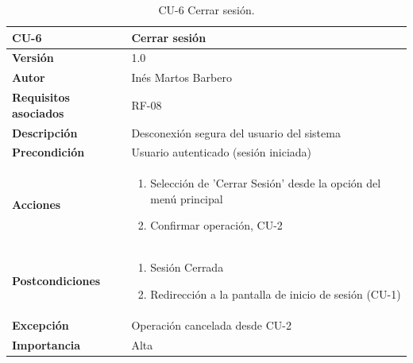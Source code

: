 \begin{table}[p]
	\centering
	\begin{tabularx}{\linewidth}{ p{} p{} }
		\toprule
		\textbf{CU-6}    & \textbf{Cerrar sesión}\\
		\toprule
		\textbf{Versión}              & 1.0    \\
		\textbf{Autor}                & Inés Martos Barbero \\
		\textbf{Requisitos asociados} & RF-08 \\
		\textbf{Descripción}          & Desconexión segura del usuario del sistema \\
		\textbf{Precondición}         & Usuario autenticado (sesión iniciada) \\
		\textbf{Acciones}             &
		\begin{enumerate}
			\def\labelenumi{\arabic{enumi}.}
			\tightlist
			\item Selección de 'Cerrar Sesión' desde la opción del menú principal
			\item Confirmar operación, CU-2
		\end{enumerate}\\
		\textbf{Postcondiciones}        & 
            \begin{enumerate}
			\def\labelenumi{\arabic{enumi}.}
			\tightlist
			\item Sesión Cerrada
			\item Redirección a la pantalla de inicio de sesión (CU-1)
		\end{enumerate}\\
		\textbf{Excepción}          & Operación cancelada desde CU-2  \\
		\textbf{Importancia}          & Alta  \\
		\bottomrule
	\end{tabularx}
	\caption{CU-6 Cerrar sesión.}
\end{table}

